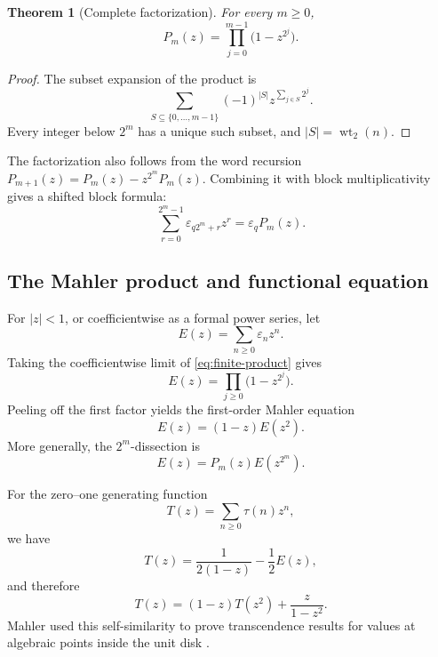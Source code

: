 \documentclass[11pt,oneside]{article}
\newtheorem{theorem}{Theorem}[section]
\theoremstyle{definition}
\theoremstyle{remark}
\newcommand{\wt}{\operatorname{wt}_2}
\begin{document}
\begin{theorem}[Complete factorization]
\label{thm:finite-product}
For every \(m\ge0\),
\begin{equation}
 P_m(z)=\prod_{j=0}^{m-1}\bigl(1-z^{2^j}\bigr).
 \label{eq:finite-product}
\end{equation}
\end{theorem}

\begin{proof}
The subset expansion of the product is
\begin{equation*}
 \sum_{S\subseteq\{0,\ldots,m-1\}}(-1)^{|S|}
 z^{\sum_{j\in S}2^j}.
\end{equation*}
Every integer below \(2^m\) has a unique such subset, and \(|S|=\wt(n)\).
\end{proof}

The factorization also follows from the word recursion
\(P_{m+1}(z)=P_m(z)-z^{2^m}P_m(z)\).  Combining it with block
multiplicativity gives a shifted block formula:
\begin{equation}
 \sum_{r=0}^{2^m-1}\varepsilon_{q2^m+r}z^r
 =\varepsilon_qP_m(z).
 \label{eq:block-polynomial}
\end{equation}

\subsection{The Mahler product and functional equation}

For \(|z|<1\), or coefficientwise as a formal power series, let
\begin{equation}
 E(z)=\sum_{n\ge0}\varepsilon_nz^n.
 \label{eq:E-def}
\end{equation}
Taking the coefficientwise limit of \eqref{eq:finite-product} gives
\begin{equation}
 \boxed{\quad E(z)=\prod_{j\ge0}\bigl(1-z^{2^j}\bigr).\quad}
 \label{eq:infinite-product-E}
\end{equation}
Peeling off the first factor yields the first-order Mahler equation
\begin{equation}
 E(z)=(1-z)E(z^2).
 \label{eq:mahler-E}
\end{equation}
More generally, the \(2^m\)-dissection is
\begin{equation}
 E(z)=P_m(z)E(z^{2^m}).
 \label{eq:dissection-E}
\end{equation}

For the zero--one generating function
\begin{equation}
 T(z)=\sum_{n\ge0}\tau(n)z^n,
 \label{eq:T-def}
\end{equation}
we have
\begin{equation}
 T(z)=\frac{1}{2(1-z)}-\frac12E(z),
 \label{eq:T-from-E}
\end{equation}
and therefore
\begin{equation}
 T(z)=(1-z)T(z^2)+\frac{z}{1-z^2}.
 \label{eq:mahler-T}
\end{equation}
Mahler used this self-similarity to prove transcendence results for values at
algebraic points inside the unit disk \cite{mahler1929}.
\end{document}
